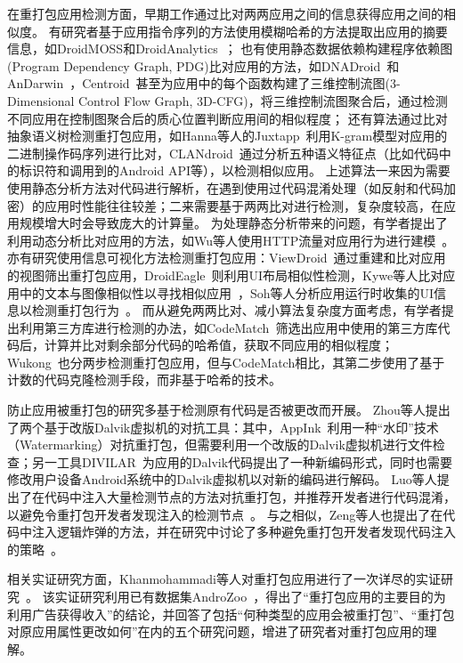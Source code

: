 在重打包应用检测方面，早期工作通过比对两两应用之间的信息获得应用之间的相似度。
有研究者基于应用指令序列的方法使用模糊哈希的方法提取出应用的摘要信息，如DroidMOSS和DroidAnalytics~\cite{DroidMOSS, Zheng2013DroidAnalyticsA}；
也有使用静态数据依赖构建程序依赖图(Program Dependency Graph, PDG)比对应用的方法，如DNADroid~\cite{DNADroid}和AnDarwin~\cite{AnDarwin}，Centroid~\cite{Centroid}甚至为应用中的每个函数构建了三维控制流图(3-Dimensional Control Flow Graph, 3D-CFG)，将三维控制流图聚合后，通过检测不同应用在控制图聚合后的质心位置判断应用间的相似程度；
还有算法通过比对抽象语义树检测重打包应用，如Hanna等人的Juxtapp~\cite{hanna2012juxtapp}利用K-gram模型对应用的二进制操作码序列进行比对，CLANdroid~\cite{CLANdroid}通过分析五种语义特征点（比如代码中的标识符和调用到的Android API等），以检测相似应用。
上述算法一来因为需要使用静态分析方法对代码进行解析，在遇到使用过代码混淆处理（如反射和代码加密）的应用时性能往往较差；二来需要基于两两比对进行检测，复杂度较高，在应用规模增大时会导致庞大的计算量。
为处理静态分析带来的问题，有学者提出了利用动态分析比对应用的方法，如Wu等人使用HTTP流量对应用行为进行建模~\cite{wu2015detect}。
亦有研究使用信息可视化方法检测重打包应用：ViewDroid~\cite{ViewDroid}通过重建和比对应用的视图筛出重打包应用，DroidEagle~\cite{sun2015droideagle}则利用UI布局相似性检测，Kywe等人比对应用中的文本与图像相似性以寻找相似应用~\cite{kywe2014detecting}，Soh等人分析应用运行时收集的UI信息以检测重打包行为~\cite{soh2015detecting}。
而从避免两两比对、减小算法复杂度方面考虑，有学者提出利用第三方库进行检测的办法，如CodeMatch~\cite{CodeMatch}筛选出应用中使用的第三方库代码后，计算并比对剩余部分代码的哈希值，获取不同应用的相似程度；Wukong~\cite{Wukong}也分两步检测重打包应用，但与CodeMatch相比，其第二步使用了基于计数的代码克隆检测手段，而非基于哈希的技术。

防止应用被重打包的研究多基于检测原有代码是否被更改而开展。
Zhou等人提出了两个基于改版Dalvik虚拟机的对抗工具：其中，AppInk~\cite{zhou2013appink}利用一种``水印''技术（Watermarking）对抗重打包，但需要利用一个改版的Dalvik虚拟机进行文件检查；另一工具DIVILAR~\cite{zhou2014divilar}为应用的Dalvik代码提出了一种新编码形式，同时也需要修改用户设备Android系统中的Dalvik虚拟机以对新的编码进行解码。
Luo等人提出了在代码中注入大量检测节点的方法对抗重打包，并推荐开发者进行代码混淆，以避免令重打包开发者发现注入的检测节点~\cite{luo2016repackage}。
与之相似，Zeng等人也提出了在代码中注入逻辑炸弹的方法，并在研究中讨论了多种避免重打包开发者发现代码注入的策略~\cite{zeng2018resilient}。

相关实证研究方面，Khanmohammadi等人对重打包应用进行了一次详尽的实证研究~\cite{khanmohammadi2019empirical}。
该实证研究利用已有数据集AndroZoo~\cite{li2017androzoo++}，得出了``重打包应用的主要目的为利用广告获得收入''的结论，并回答了包括``何种类型的应用会被重打包''、``重打包对原应用属性更改如何''在内的五个研究问题，增进了研究者对重打包应用的理解。

